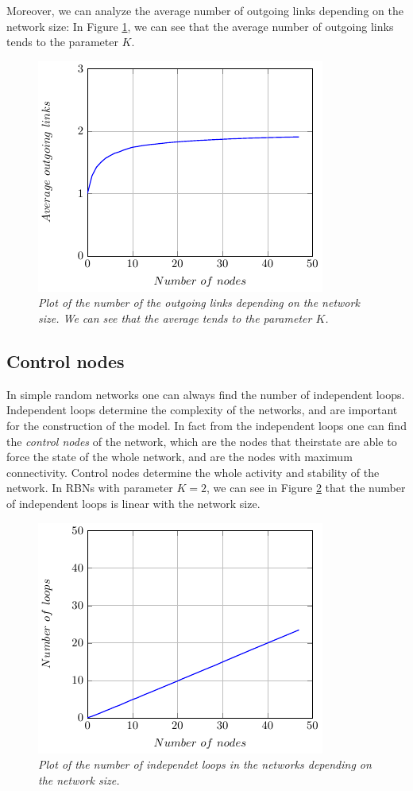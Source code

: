 Moreover, we can analyze the average number of outgoing links depending on the network size: In Figure \ref{fig:outgoing}, we can see that the average number of outgoing links tends to the parameter $K$.
\begin{figure}[h]
\centering
\includegraphics[scale=1.5]{images/outgoing.pdf}
\caption{\emph{Plot of the number of the outgoing links depending on the network size. We can see that the average tends to the parameter $K$. }}
\label{fig:outgoing}
\end{figure}



\subsection{Control nodes}
In simple random networks one can always find the number of independent loops.
Independent loops determine the complexity of the networks\cite{K38}, and are important for the construction of the model. In fact from the independent loops one can find the \emph{control nodes} of the network, which are the nodes that theirstate are able to force the state of the whole network, and are the nodes with maximum connectivity. Control nodes determine the whole activity and stability of the network. 
In RBNs with parameter $K=2$, we can see in Figure \ref{fig:loops} that the number of independent loops is linear with the network size.
\begin{figure}[h]
\centering
\includegraphics[scale=1.5]{images/loops.pdf}
\caption{\emph{Plot of the number of independet loops in the networks depending on the network size.}}
\label{fig:loops}
\end{figure}






